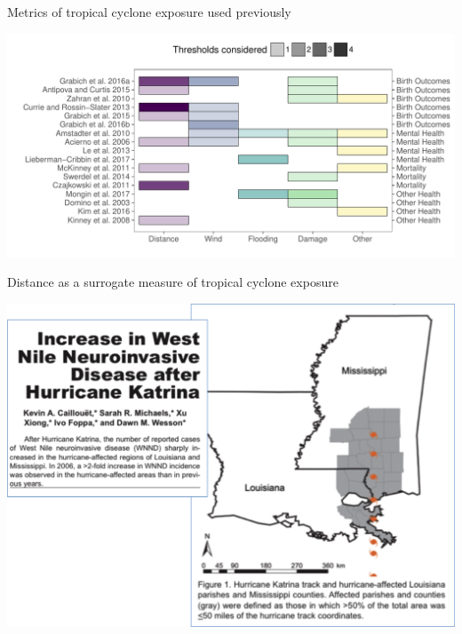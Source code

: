 \documentclass[ignorenonframetext,]{beamer}
\begin{document}
\begin{frame}{Metrics of tropical cyclone exposure used previously}

\begin{center}\includegraphics[width=\textwidth]{figures/previous_exposure_metrics} \end{center}

\end{frame}

\begin{frame}{Distance as a surrogate measure of tropical cyclone
exposure}

\begin{center}\includegraphics[width=\textwidth]{figures/katrina_west_nile} \end{center}

\end{frame}
\end{document}
